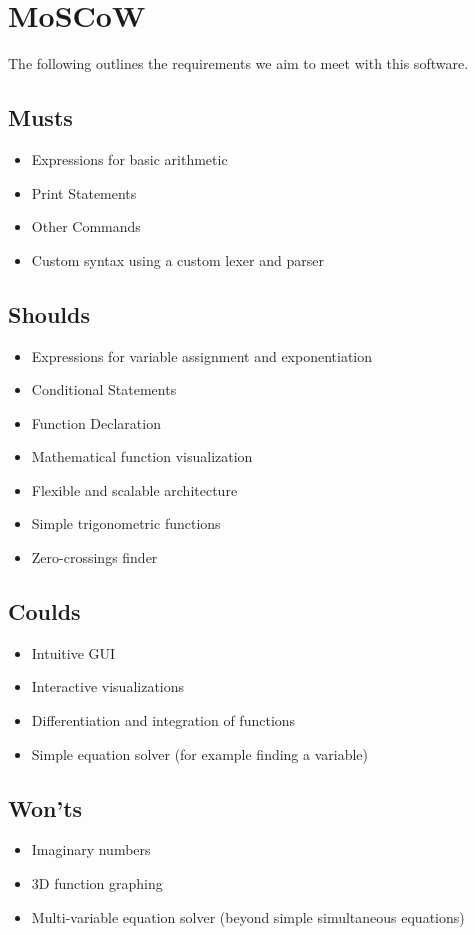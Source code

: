 \documentclass[a4paper, oneside, 11pt]{report}
\begin{document}
\section{MoSCoW}
The following outlines the requirements we aim to meet with this software.

\subsection{Musts}

\begin{itemize}
	\item Expressions for basic arithmetic
	\item Print Statements
	\item Other Commands
	\item Custom syntax using a custom lexer and parser
\end{itemize}

\subsection{Shoulds}

\begin{itemize}
	\item Expressions for variable assignment and exponentiation
	\item Conditional Statements
	\item Function Declaration
	\item Mathematical function visualization
	\item Flexible and scalable architecture
	\item Simple trigonometric functions
	\item Zero-crossings finder
\end{itemize}

\subsection{Coulds}
\begin{itemize}
	\item Intuitive GUI
	\item Interactive visualizations
	\item Differentiation and integration of functions
	\item Simple equation solver (for example finding a variable)
\end{itemize}

\subsection{Won'ts}
\begin{itemize}
	\item Imaginary numbers
	\item 3D function graphing
	\item Multi-variable equation solver (beyond simple simultaneous equations)
\end{itemize}
\end{document}
